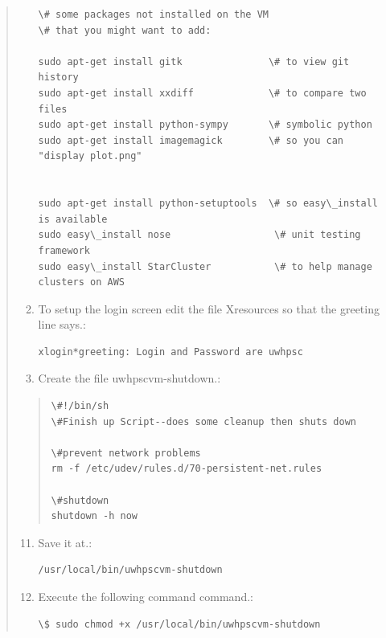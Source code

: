 \documentclass[letterpaper,10pt,english]{sphinxmanual}
\begin{document}
\begin{quote}
\begin{enumerate}
\begin{Verbatim}[commandchars=\\\{\}]
\# some packages not installed on the VM 
\# that you might want to add:

sudo apt-get install gitk               \# to view git history
sudo apt-get install xxdiff             \# to compare two files
sudo apt-get install python-sympy       \# symbolic python
sudo apt-get install imagemagick        \# so you can "display plot.png"


sudo apt-get install python-setuptools  \# so easy\_install is available
sudo easy\_install nose                  \# unit testing framework
sudo easy\_install StarCluster           \# to help manage clusters on AWS
\end{Verbatim}

\item {} 
To setup the login screen edit the file Xresources so that the
greeting line says.:

\begin{Verbatim}[commandchars=\\\{\}]
xlogin*greeting: Login and Password are uwhpsc
\end{Verbatim}

\item {} 
Create the file uwhpscvm-shutdown.:

\end{enumerate}
\begin{quote}

\begin{Verbatim}[commandchars=\\\{\}]
\#!/bin/sh
\#Finish up Script--does some cleanup then shuts down

\#prevent network problems
rm -f /etc/udev/rules.d/70-persistent-net.rules

\#shutdown
shutdown -h now
\end{Verbatim}
\end{quote}
\begin{enumerate}
\setcounter{enumi}{10}
\item {} 
Save it at.:

\begin{Verbatim}[commandchars=\\\{\}]
/usr/local/bin/uwhpscvm-shutdown
\end{Verbatim}

\item {} 
Execute the following command command.:

\begin{Verbatim}[commandchars=\\\{\}]
\$ sudo chmod +x /usr/local/bin/uwhpscvm-shutdown
\end{Verbatim}


\end{enumerate}
\end{quote}
\end{document}
